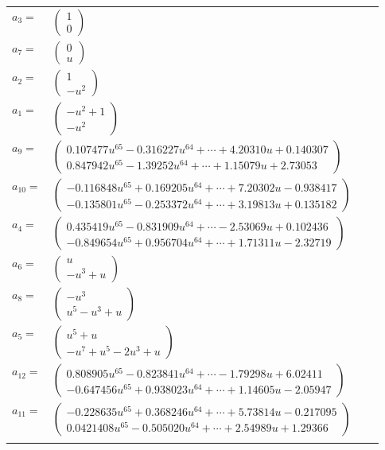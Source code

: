 \documentclass[1p]{elsarticle_modified}
\theoremstyle{definition}
\begin{document}
\begin{tabular}{m{7pt} m{180pt} m{7pt} m{180pt} }
\flushright $a_{3}=$&$\begin{pmatrix}1\\0\end{pmatrix}$ \\
\flushright $a_{7}=$&$\begin{pmatrix}0\\u\end{pmatrix}$ \\
\flushright $a_{2}=$&$\begin{pmatrix}1\\- u^2\end{pmatrix}$ \\
\flushright $a_{1}=$&$\begin{pmatrix}- u^2+1\\- u^2\end{pmatrix}$ \\
\flushright $a_{9}=$&$\begin{pmatrix}0.107477 u^{65}-0.316227 u^{64}+\cdots+4.20310 u+0.140307\\0.847942 u^{65}-1.39252 u^{64}+\cdots+1.15079 u+2.73053\end{pmatrix}$ \\
\flushright $a_{10}=$&$\begin{pmatrix}-0.116848 u^{65}+0.169205 u^{64}+\cdots+7.20302 u-0.938417\\-0.135801 u^{65}-0.253372 u^{64}+\cdots+3.19813 u+0.135182\end{pmatrix}$ \\
\flushright $a_{4}=$&$\begin{pmatrix}0.435419 u^{65}-0.831909 u^{64}+\cdots-2.53069 u+0.102436\\-0.849654 u^{65}+0.956704 u^{64}+\cdots+1.71311 u-2.32719\end{pmatrix}$ \\
\flushright $a_{6}=$&$\begin{pmatrix}u\\- u^3+u\end{pmatrix}$ \\
\flushright $a_{8}=$&$\begin{pmatrix}- u^3\\u^5- u^3+u\end{pmatrix}$ \\
\flushright $a_{5}=$&$\begin{pmatrix}u^5+u\\- u^7+u^5-2 u^3+u\end{pmatrix}$ \\
\flushright $a_{12}=$&$\begin{pmatrix}0.808905 u^{65}-0.823841 u^{64}+\cdots-1.79298 u+6.02411\\-0.647456 u^{65}+0.938023 u^{64}+\cdots+1.14605 u-2.05947\end{pmatrix}$ \\
\flushright $a_{11}=$&$\begin{pmatrix}-0.228635 u^{65}+0.368246 u^{64}+\cdots+5.73814 u-0.217095\\0.0421408 u^{65}-0.505020 u^{64}+\cdots+2.54989 u+1.29366\end{pmatrix}$\\&\end{tabular}
\end{document}
